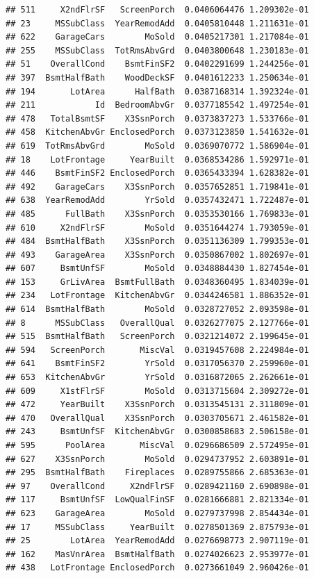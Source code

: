 \documentclass[american,]{article}
\theoremstyle{definition}
\theoremstyle{definition}
\theoremstyle{definition}
\theoremstyle{remark}
\begin{document}
\begin{verbatim}
## 511     X2ndFlrSF   ScreenPorch  0.0406064476 1.209302e-01
## 23     MSSubClass  YearRemodAdd  0.0405810448 1.211631e-01
## 622    GarageCars        MoSold  0.0405217301 1.217084e-01
## 255    MSSubClass  TotRmsAbvGrd  0.0403800648 1.230183e-01
## 51    OverallCond    BsmtFinSF2  0.0402291699 1.244256e-01
## 397  BsmtHalfBath    WoodDeckSF  0.0401612233 1.250634e-01
## 194       LotArea      HalfBath  0.0387168314 1.392324e-01
## 211            Id  BedroomAbvGr  0.0377185542 1.497254e-01
## 478   TotalBsmtSF    X3SsnPorch  0.0373837273 1.533766e-01
## 458  KitchenAbvGr EnclosedPorch  0.0373123850 1.541632e-01
## 619  TotRmsAbvGrd        MoSold  0.0369070772 1.586904e-01
## 18    LotFrontage     YearBuilt  0.0368534286 1.592971e-01
## 446    BsmtFinSF2 EnclosedPorch  0.0365433394 1.628382e-01
## 492    GarageCars    X3SsnPorch  0.0357652851 1.719841e-01
## 638  YearRemodAdd        YrSold  0.0357432471 1.722487e-01
## 485      FullBath    X3SsnPorch  0.0353530166 1.769833e-01
## 610     X2ndFlrSF        MoSold  0.0351644274 1.793059e-01
## 484  BsmtHalfBath    X3SsnPorch  0.0351136309 1.799353e-01
## 493    GarageArea    X3SsnPorch  0.0350867002 1.802697e-01
## 607     BsmtUnfSF        MoSold  0.0348884430 1.827454e-01
## 153     GrLivArea  BsmtFullBath  0.0348360495 1.834039e-01
## 234   LotFrontage  KitchenAbvGr  0.0344246581 1.886352e-01
## 614  BsmtHalfBath        MoSold  0.0328727052 2.093598e-01
## 8      MSSubClass   OverallQual  0.0326277075 2.127766e-01
## 515  BsmtHalfBath   ScreenPorch  0.0321214072 2.199645e-01
## 594   ScreenPorch       MiscVal  0.0319457608 2.224984e-01
## 641    BsmtFinSF2        YrSold  0.0317056370 2.259960e-01
## 653  KitchenAbvGr        YrSold  0.0316872065 2.262661e-01
## 609     X1stFlrSF        MoSold  0.0313715604 2.309272e-01
## 472     YearBuilt    X3SsnPorch  0.0313545131 2.311809e-01
## 470   OverallQual    X3SsnPorch  0.0303705671 2.461582e-01
## 243     BsmtUnfSF  KitchenAbvGr  0.0300858683 2.506158e-01
## 595      PoolArea       MiscVal  0.0296686509 2.572495e-01
## 627    X3SsnPorch        MoSold  0.0294737952 2.603891e-01
## 295  BsmtHalfBath    Fireplaces  0.0289755866 2.685363e-01
## 97    OverallCond     X2ndFlrSF  0.0289421160 2.690898e-01
## 117     BsmtUnfSF  LowQualFinSF  0.0281666881 2.821334e-01
## 623    GarageArea        MoSold  0.0279737998 2.854434e-01
## 17     MSSubClass     YearBuilt  0.0278501369 2.875793e-01
## 25        LotArea  YearRemodAdd  0.0276698773 2.907119e-01
## 162    MasVnrArea  BsmtHalfBath  0.0274026623 2.953977e-01
## 438   LotFrontage EnclosedPorch  0.0273661049 2.960426e-01

\end{verbatim}
\end{document}
